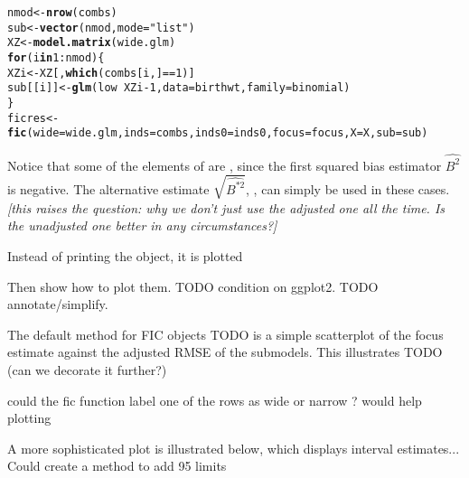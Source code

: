 \documentclass[article,shortnames,nojss,nofooter]{jss}\usepackage[]{graphicx}\usepackage[]{color}
\makeatletter
\newcommand{\hlnum}[1]{\textcolor[rgb]{0.686,0.059,0.569}{#1}}%
\newcommand{\hlstr}[1]{\textcolor[rgb]{0.192,0.494,0.8}{#1}}%
\newcommand{\hlopt}[1]{\textcolor[rgb]{0,0,0}{#1}}%
\newcommand{\hlstd}[1]{\textcolor[rgb]{0.345,0.345,0.345}{#1}}%
\newcommand{\hlkwa}[1]{\textcolor[rgb]{0.161,0.373,0.58}{\textbf{#1}}}%
\newcommand{\hlkwb}[1]{\textcolor[rgb]{0.69,0.353,0.396}{#1}}%
\newcommand{\hlkwc}[1]{\textcolor[rgb]{0.333,0.667,0.333}{#1}}%
\newcommand{\hlkwd}[1]{\textcolor[rgb]{0.737,0.353,0.396}{\textbf{#1}}}%
\newenvironment{kframe}{%
 \def\at@end@of@kframe{}%
 \ifinner\ifhmode%
  \def\at@end@of@kframe{\end{minipage}}%
  \begin{minipage}{\columnwidth}%
 \fi\fi%
 \def\FrameCommand##1{\hskip\@totalleftmargin \hskip-\fboxsep
 \colorbox{shadecolor}{##1}\hskip-\fboxsep
     \hskip-\linewidth \hskip-\@totalleftmargin \hskip\columnwidth}%
 \MakeFramed {\advance\hsize-\width
   \@totalleftmargin\z@ \linewidth\hsize
   \@setminipage}}%
 {\par\unskip\endMakeFramed%
 \at@end@of@kframe}
\newenvironment{knitrout}{}{} %
\makeatother
\begin{document}
\begin{knitrout}
\color{fgcolor}\begin{kframe}
\begin{alltt}
\hlstd{nmod} \hlkwb{<-} \hlkwd{nrow}\hlstd{(combs)}
\hlstd{sub} \hlkwb{<-} \hlkwd{vector}\hlstd{(nmod,} \hlkwc{mode}\hlstd{=}\hlstr{"list"}\hlstd{)}
\hlstd{XZ} \hlkwb{<-} \hlkwd{model.matrix}\hlstd{(wide.glm)}
\hlkwa{for} \hlstd{(i} \hlkwa{in} \hlnum{1}\hlopt{:}\hlstd{nmod)\{}
  \hlstd{XZi} \hlkwb{<-} \hlstd{XZ[,}\hlkwd{which}\hlstd{(combs[i,]}\hlopt{==}\hlnum{1}\hlstd{)]}
  \hlstd{sub[[i]]} \hlkwb{<-} \hlkwd{glm}\hlstd{(low} \hlopt{~} \hlstd{XZi} \hlopt{-} \hlnum{1}\hlstd{,} \hlkwc{data}\hlstd{=birthwt,} \hlkwc{family}\hlstd{=binomial)}
\hlstd{\}}
\hlstd{ficres} \hlkwb{<-} \hlkwd{fic}\hlstd{(}\hlkwc{wide}\hlstd{=wide.glm,} \hlkwc{inds}\hlstd{=combs,} \hlkwc{inds0}\hlstd{=inds0,} \hlkwc{focus}\hlstd{=focus,} \hlkwc{X}\hlstd{=X,} \hlkwc{sub}\hlstd{=sub)}
\end{alltt}
\end{kframe}
\end{knitrout}

Notice that some of the  elements of  are
, since the first squared bias estimator $\widehat{B^2}$ is
negative.  The alternative estimate $\sqrt{\widehat{B^{*2}}}$,
, can
simply be used in these cases.  \emph{[this raises the question: why we
  don't just use the adjusted one all the time.  Is the unadjusted one
  better in any circumstances?]}

Instead of printing the  object, it is plotted 

Then show how to plot them. TODO condition on ggplot2.  TODO annotate/simplify.

The default  method for FIC objects TODO is a simple
scatterplot of the focus estimate against the adjusted RMSE of the
submodels.   This illustrates TODO 
(can we decorate it further?) 

could the fic function label one of the rows as wide or narrow ? would
help plotting 
 
A more sophisticated plot is illustrated below, which displays interval
estimates... 
Could create a method to 
add 95 limits 
\end{document}
